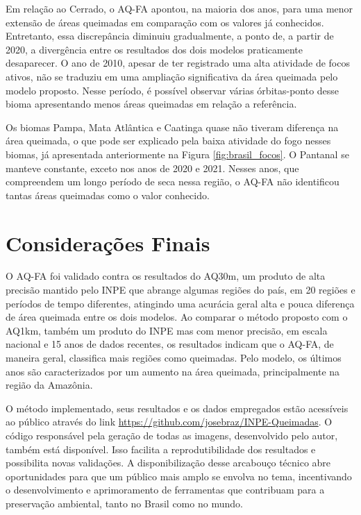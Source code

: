 \documentclass[cic,tc]{iiufrgs}
\begin{document}
Em relação ao Cerrado, o AQ-FA apontou, na maioria dos anos, para uma menor extensão de áreas queimadas em comparação com os valores já conhecidos. Entretanto, essa discrepância diminuiu gradualmente, a ponto de, a partir de 2020, a divergência entre os resultados dos dois modelos praticamente desaparecer. O ano de 2010, apesar de ter registrado uma alta atividade de focos ativos, não se traduziu em uma ampliação significativa da área queimada pelo modelo proposto. Nesse período, é possível observar várias órbitas-ponto desse bioma apresentando menos áreas queimadas em relação a referência.

Os biomas Pampa, Mata Atlântica e Caatinga quase não tiveram diferença na área queimada, o que pode ser explicado pela baixa atividade do fogo nesses biomas, já apresentada anteriormente na Figura \ref{fig:brasil_focos}. O Pantanal se manteve constante, exceto nos anos de 2020 e 2021. Nesses anos, que compreendem um longo período de seca nessa região, o AQ-FA não identificou tantas áreas queimadas como o valor conhecido.



\chapter{Considerações Finais}



O AQ-FA foi validado contra os resultados do AQ30m, um produto de alta precisão mantido pelo INPE que abrange algumas regiões do país, em 20 regiões e períodos de tempo diferentes, atingindo uma acurácia geral alta e pouca diferença de área queimada entre os dois modelos. Ao comparar o método proposto com o AQ1km, também um produto do INPE mas com menor precisão, em escala nacional e 15 anos de dados recentes, os resultados indicam que o AQ-FA, de maneira geral, classifica mais regiões como queimadas. Pelo modelo, os últimos anos são caracterizados por um aumento na área queimada, principalmente na região da Amazônia.



O método implementado, seus resultados e os dados empregados estão acessíveis ao público através do link \url{https://github.com/josebraz/INPE-Queimadas}. O código responsável pela geração de todas as imagens, desenvolvido pelo autor, também está disponível. Isso facilita a reprodutibilidade dos resultados e possibilita novas validações. A disponibilização desse arcabouço técnico abre oportunidades para que um público mais amplo se envolva no tema, incentivando o desenvolvimento e aprimoramento de ferramentas que contribuam para a preservação ambiental, tanto no Brasil como no mundo.
\end{document}

